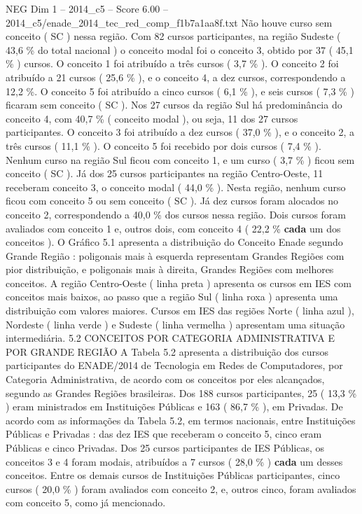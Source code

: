 \begin{textsample}{NEG Dim 1 – 2014\_c5 – Score 6.00 – 2014\_c5/enade\_2014\_tec\_red\_comp\_f1b7a1aa8f.txt}
Não houve curso sem conceito ( SC ) nessa região.
Com 82 cursos participantes, na região Sudeste ( 43,6 \% do total nacional ) o conceito modal foi o conceito 3, obtido por 37 ( 45,1 \% ) cursos.
O conceito 1 foi atribuído a três cursos ( 3,7 \% ).
O conceito 2 foi atribuído a 21 cursos ( 25,6 \% ), e o conceito 4, a dez cursos, correspondendo a 12,2 \%.
O conceito 5 foi atribuído a cinco cursos ( 6,1 \% ), e seis cursos ( 7,3 \% ) ficaram sem conceito ( SC ).
Nos 27 cursos da região Sul há predominância do conceito 4, com 40,7 \% ( conceito modal ), ou seja, 11 dos 27 cursos participantes.
O conceito 3 foi atribuído a dez cursos ( 37,0 \% ), e o conceito 2, a três cursos ( 11,1 \% ).
O conceito 5 foi recebido por dois cursos ( 7,4 \% ).
Nenhum curso na região Sul ficou com conceito 1, e um curso ( 3,7 \% ) ficou sem conceito ( SC ).
Já dos 25 cursos participantes na região Centro-Oeste, 11 receberam conceito 3, o conceito modal ( 44,0 \% ).
Nesta região, nenhum curso ficou com conceito 5 ou sem conceito ( SC ).
Já dez cursos foram alocados no conceito 2, correspondendo a 40,0 \% dos cursos nessa região.
Dois cursos foram avaliados com conceito 1 e, outros dois, com conceito 4 ( 22,2 \% \textbf{cada} um dos conceitos ).
O Gráfico 5.1 apresenta a distribuição do Conceito Enade segundo Grande Região : poligonais mais à esquerda representam Grandes Regiões com pior distribuição, e poligonais mais à direita, Grandes Regiões com melhores conceitos.
A região Centro-Oeste ( linha preta ) apresenta os cursos em IES com conceitos mais baixos, ao passo que a região Sul ( linha roxa ) apresenta uma distribuição com valores maiores.
Cursos em IES das regiões Norte ( linha azul ), Nordeste ( linha verde ) e Sudeste ( linha vermelha ) apresentam uma situação intermediária. 5.2 CONCEITOS POR CATEGORIA ADMINISTRATIVA E POR GRANDE REGIÃO A Tabela 5.2 apresenta a distribuição dos cursos participantes do ENADE/2014 de Tecnologia em Redes de Computadores, por Categoria Administrativa, de acordo com os conceitos por eles alcançados, segundo as Grandes Regiões brasileiras.
Dos 188 cursos participantes, 25 ( 13,3 \% ) eram ministrados em Instituições Públicas e 163 ( 86,7 \% ), em Privadas.
De acordo com as informações da Tabela 5.2, em termos nacionais, entre Instituições Públicas e Privadas : das dez IES que receberam o conceito 5, cinco eram Públicas e cinco Privadas.
Dos 25 cursos participantes de IES Públicas, os conceitos 3 e 4 foram modais, atribuídos a 7 cursos ( 28,0 \% ) \textbf{cada} um desses conceitos.
Entre os demais cursos de Instituições Públicas participantes, cinco cursos ( 20,0 \% ) foram avaliados com conceito 2, e, outros cinco, foram avaliados com conceito 5, como já mencionado.

\end{textsample}
